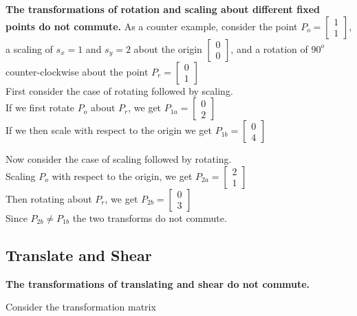 \documentclass[a4paper,10pt]{scrartcl}
\begin{document}
{\bfseries The transformations of rotation and scaling about different fixed points do not commute.} As a counter example, consider 
the point $P_o = \begin{bmatrix} 1 \\ 1 \end{bmatrix}$, a scaling of $s_x = 1$ and $s_y = 2$ about the origin
$\begin{bmatrix} 0 \\ 0\end{bmatrix}$, and a rotation of $90^o$ counter-clockwise about the point $P_r = \begin{bmatrix} 0 \\ 1\end{bmatrix}$\\

First consider the case of rotating followed by scaling.\\
If we first rotate $P_o$ about $P_r$, we get $P_{1a} = \begin{bmatrix} 0 \\ 2 \end{bmatrix}$\\
If we then scale with respect to the origin we get $P_{1b} = \begin{bmatrix} 0 \\ 4\end{bmatrix}$


Now consider the case of scaling followed by rotating.\\
Scaling $P_o$ with respect to the origin, we get $P_{2a} = \begin{bmatrix} 2 \\ 1\end{bmatrix}$\\
Then rotating about $P_r$, we get $P_{2b} = \begin{bmatrix} 0 \\ 3\end{bmatrix}$\\

Since $P_{2b} \neq P_{1b}$ the two transforms do not commute.

\subsection{Translate and Shear}

{\bfseries The transformations of translating and shear do not commute.}

Consider the transformation matrix \\
\end{document}
